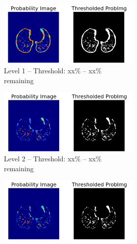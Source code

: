 \begin{figure}[p] %
\begin{center}
	\begin{subfigure}[b]{0.45\linewidth}
		\begin{subfigure}[b]{\linewidth}
			\includegraphics[width=\linewidth]{img/cascades/D50L1S50.png}
			\caption{Level 1 -- Threshold: xx\% -- xx\% remaining}
		\end{subfigure}
		\begin{subfigure}[b]{\linewidth}
			\includegraphics[width=\linewidth]{img/cascades/D50L2S50.png}
			\caption{Level 2 -- Threshold: xx\% -- xx\% remaining}
		\end{subfigure}
		\begin{subfigure}[b]{\linewidth}
			\includegraphics[width=\linewidth]{img/cascades/D50L3S50.png}

\end{subfigure}
\end{subfigure}
\end{center}
\end{figure}

